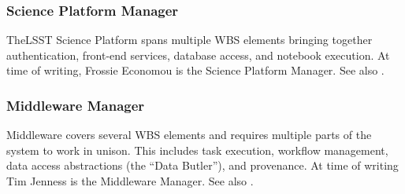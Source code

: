\subsubsection{Science Platform Manager}\label{role:lsplead}

TheLSST \gls{Science Platform} spans multiple \gls{WBS} elements bringing together authentication, front-end services, database access, and notebook execution.
At time of writing, Frossie Economou is the \gls{Science Platform} Manager.
See also .

\subsubsection{Middleware Manager}\label{role:mwlead}

Middleware covers several \gls{WBS} elements and requires multiple parts of the system to work in unison.
This includes task execution, workflow management, data access abstractions (the ``Data \gls{Butler}''), and \gls{provenance}.
At time of writing Tim Jenness is the Middleware Manager.
See also .

